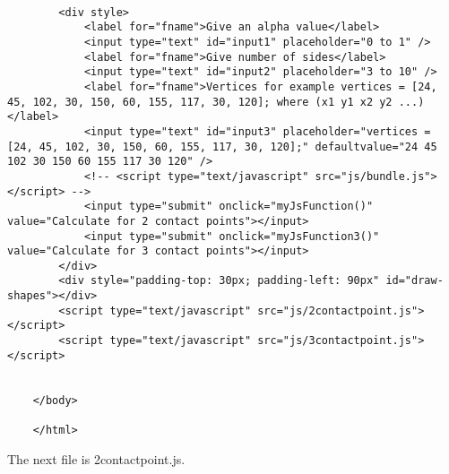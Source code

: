 \documentclass[letterpaper, 10 pt, conference]{ieeeconf}
\begin{document}
\begin{lstlisting}[style=htmlcssjs]
    
        <div style>
            <label for="fname">Give an alpha value</label>
            <input type="text" id="input1" placeholder="0 to 1" />
            <label for="fname">Give number of sides</label>
            <input type="text" id="input2" placeholder="3 to 10" />
            <label for="fname">Vertices for example vertices = [24, 45, 102, 30, 150, 60, 155, 117, 30, 120]; where (x1 y1 x2 y2 ...)</label>
            <input type="text" id="input3" placeholder="vertices = [24, 45, 102, 30, 150, 60, 155, 117, 30, 120];" defaultvalue="24 45 102 30 150 60 155 117 30 120" />
            <!-- <script type="text/javascript" src="js/bundle.js"></script> -->
            <input type="submit" onclick="myJsFunction()" value="Calculate for 2 contact points"></input>
            <input type="submit" onclick="myJsFunction3()" value="Calculate for 3 contact points"></input>
        </div>
        <div style="padding-top: 30px; padding-left: 90px" id="draw-shapes"></div>
        <script type="text/javascript" src="js/2contactpoint.js"></script>
        <script type="text/javascript" src="js/3contactpoint.js"></script>
    
    
    </body>
    
    </html>
    \end{lstlisting}
    
    
    The next file is 2contactpoint.js.
    
\end{document}
